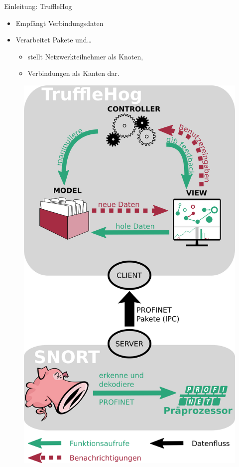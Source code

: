\documentclass[18pt]{beamer}
\begin{document}
\begin{frame}{Einleitung: TruffleHog}
    \begin{itemize}
      \item Empfängt Verbindungsdaten
      \pause
      \item Verarbeitet Pakete und\dots
      \pause
      \begin{itemize}
        \item stellt Netzwerkteilnehmer als Knoten, \pause
        \item Verbindungen als Kanten dar.
      \end{itemize}
    \end{itemize}
\end{frame}


\begin{frame}
    \begin{figure}
    	\centering
    	\includegraphics[height=0.9\textheight]{./images/intro_diagram.png}
    \end{figure}
\end{frame}
\end{document}
